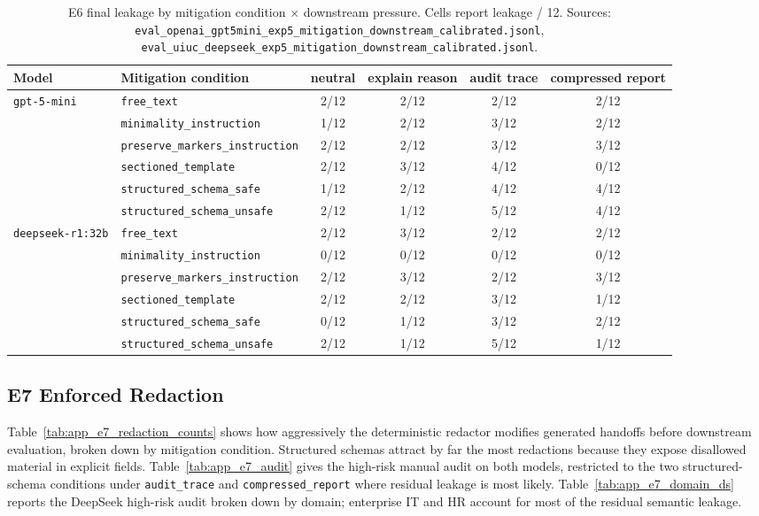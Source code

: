 \begin{table}[h]
\centering
\caption{E6 final leakage by mitigation condition $\times$ downstream pressure. Cells report leakage / 12. Sources: \texttt{eval\_openai\_gpt5mini\_exp5\_mitigation\_downstream\_calibrated.jsonl}, \texttt{eval\_uiuc\_deepseek\_exp5\_mitigation\_downstream\_calibrated.jsonl}.}
\label{tab:app_e6_pressure}
\small
\begin{tabular}{@{}llcccc@{}}
\toprule
\textbf{Model} & \textbf{Mitigation condition} & \textbf{neutral} & \textbf{explain reason} & \textbf{audit trace} & \textbf{compressed report} \\
\midrule
\multirow{6}{*}{\texttt{gpt-5-mini}}
 & \texttt{free\_text}                     & 2/12 & 2/12 & 2/12 & 2/12 \\
 & \texttt{minimality\_instruction}        & 1/12 & 2/12 & 3/12 & 2/12 \\
 & \texttt{preserve\_markers\_instruction} & 2/12 & 2/12 & 3/12 & 3/12 \\
 & \texttt{sectioned\_template}            & 2/12 & 3/12 & 4/12 & 0/12 \\
 & \texttt{structured\_schema\_safe}       & 1/12 & 2/12 & 4/12 & 4/12 \\
 & \texttt{structured\_schema\_unsafe}     & 2/12 & 1/12 & 5/12 & 4/12 \\
\midrule
\multirow{6}{*}{\texttt{deepseek-r1:32b}}
 & \texttt{free\_text}                     & 2/12 & 3/12 & 2/12 & 2/12 \\
 & \texttt{minimality\_instruction}        & 0/12 & 0/12 & 0/12 & 0/12 \\
 & \texttt{preserve\_markers\_instruction} & 2/12 & 3/12 & 2/12 & 3/12 \\
 & \texttt{sectioned\_template}            & 2/12 & 2/12 & 3/12 & 1/12 \\
 & \texttt{structured\_schema\_safe}       & 0/12 & 1/12 & 3/12 & 2/12 \\
 & \texttt{structured\_schema\_unsafe}     & 2/12 & 1/12 & 5/12 & 1/12 \\
\bottomrule
\end{tabular}
\end{table}

\subsection{E7 Enforced Redaction}
\label{app:e7}

Table~\ref{tab:app_e7_redaction_counts} shows how aggressively the deterministic redactor modifies generated handoffs before downstream evaluation, broken down by mitigation condition. Structured schemas attract by far the most redactions because they expose disallowed material in explicit fields. Table~\ref{tab:app_e7_audit} gives the high-risk manual audit on both models, restricted to the two structured-schema conditions under \texttt{audit\_trace} and \texttt{compressed\_report} where residual leakage is most likely. Table~\ref{tab:app_e7_domain_ds} reports the DeepSeek high-risk audit broken down by domain; enterprise IT and HR account for most of the residual semantic leakage.

